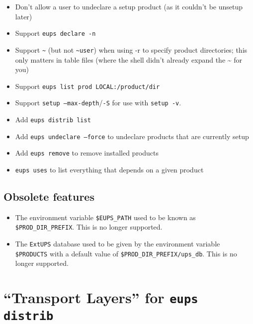 \documentclass{article}
\newcommand{\code}[1]{\texttt{#1}}
\newcommand{\eups}{\code{ExtUPS}}
\begin{document}
\begin{itemize}
  \item
    Don't allow a user to undeclare a setup product (as it couldn't be unsetup later)

  \item
    Support \code{eups declare -n}

  \item
    Support \code{\~} (but not \code{\~{}user}) when using -r to specify product directories;
    this only matters in table files (where the shell didn't already expand
    the \~{} for you)

  \item
    Support \code{eups list prod LOCAL:/product/dir}

  \item
    Support \code{setup --max-depth}/\code{-S} for use with \code{setup -v}.

  \item
    Add \code{eups distrib list}

  \item
    Add \code{eups undeclare --force} to undeclare products that are currently
    setup

  \item
    Add \code{eups remove} to remove installed products

  \item \code{eups uses} to list everything that depends on a given product
    
\end{itemize}

\subsection{Obsolete features}

\begin{itemize}
  \item The environment variable \code{\$EUPS\_PATH} used to be known
  as \code{\$PROD\_DIR\_PREFIX}. This is no longer supported.

  \item The \eups{} database used to be given by the environment variable \code{\$PRODUCTS}
    with a default value of \code{\$PROD\_DIR\_PREFIX/ups\_db}. This is no longer supported.
\end{itemize}

\section{``Transport Layers'' for \code{eups distrib}}
\label{pacman}
\end{document}
